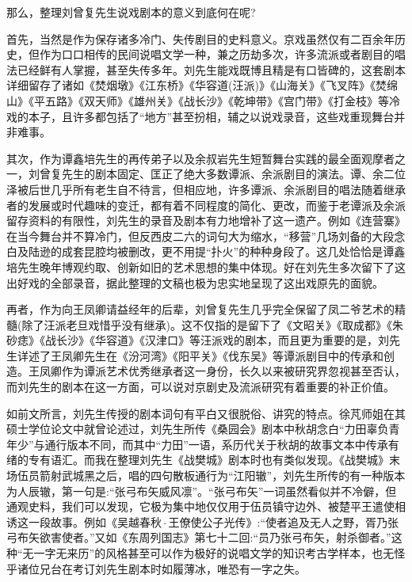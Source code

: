 {那么，整理刘曾复先生说戏剧本的意义到底何在呢?

首先，当然是作为保存诸多冷门、失传剧目的史料意义。京戏虽然仅有二百余年历史，但作为口口相传的民间说唱文学一种，兼之历劫多次，许多流派或者剧目的唱法已经鲜有人掌握，甚至失传多年。刘先生能戏既博且精是有口皆碑的，这套剧本详细留存了诸如《焚烟墩》《江东桥》《华容道(汪派)》《山海关》《飞叉阵》《焚绵山》《平五路》《双天师》《雄州关》《战长沙》《乾坤带》《宫门带》《打金枝》等冷戏的本子，且许多都包括了``地方''甚至扮相，辅之以说戏录音，这些戏重现舞台并非难事。

其次，作为谭鑫培先生的再传弟子以及余叔岩先生短暂舞台实践的最全面观摩者之一，刘曾复先生的剧本固定、匡正了绝大多数谭派、余派剧目的演法。谭、余二位泽被后世几乎所有老生自不待言，但相应地，许多谭派、余派剧目的唱法随着继承者的发展或时代趣味的变迁，都有着不同程度的简化、更改，而鉴于老谭派及余派留存资料的有限性，刘先生的录音及剧本有力地增补了这一遗产。例如《连营寨》在当今舞台并不算冷门，但反西皮二六的词句大为缩水，``移营''几场刘备的大段念白及陆逊的成套昆腔均被删改，更不用提``扑火''的种种身段了。这几处恰恰是谭鑫培先生晚年博观约取、创新如旧的艺术思想的集中体现。好在刘先生多次留下了这出好戏的全部录音，据此整理的文稿也极为忠实地呈现了这出戏原先的面貌。

再者，作为向王凤卿请益经年的后辈，刘曾复先生几乎完全保留了凤二爷艺术的精髓(除了汪派老旦戏惜乎没有继承)。这不仅指的是留下了《文昭关》《取成都》《朱砂痣》《战长沙》《华容道》《汉津口》等汪派戏的剧本，而且更为重要的是，刘先生详述了王凤卿先生在《汾河湾》《阳平关》《伐东吴》等谭派剧目中的传承和创造。王凤卿作为谭派艺术优秀继承者这一身份，长久以来被研究界忽视甚至否认，而刘先生的剧本在这一方面，可以说对京剧史及流派研究有着重要的补正价值。

如前文所言，刘先生传授的剧本词句有平白又很脱俗、讲究的特点。徐芃师姐在其硕士学位论文中就曾论述过，刘先生所传《桑园会》剧本中秋胡念白``力田辜负青年少''与通行版本不同，而其中``力田''一语，系历代关于秋胡的故事文本中传承有绪的专有语汇。而我在整理刘先生《战樊城》剧本时也有类似发现。《战樊城》末场伍员箭射武城黑之后，唱的四句散板通行为``江阳辙''，刘先生所传的有一种版本为人辰辙，第一句是:``张弓布矢威风凛''。``张弓布矢''一词虽然看似并不冷僻，但通观史料，我们可以发现，它极为集中地仅仅用于伍员镇守边外、被楚平王遣使相诱这一段故事。例如《吴越春秋$\!\cdot\!$王僚使公子光传》:``使者追及无人之野，胥乃张弓布矢欲害使者。''又如《东周列国志》第七十二回:``员乃张弓布矢，射杀御者。''这种``无一字无来历''的风格甚至可以作为极好的说唱文学的知识考古学样本，也无怪乎诸位兄台在考订刘先生剧本时如履薄冰，唯恐有一字之失。

}
